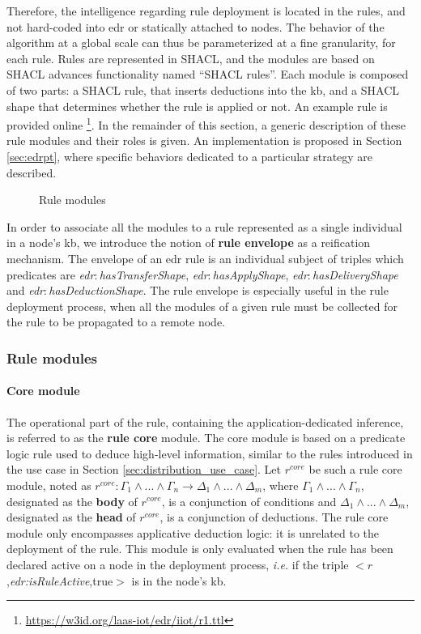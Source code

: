 \documentclass{iosart2c}
\newcommand{\namespace}[1]{\textit{#1$:$}}
\newcommand{\concept}[2]{\namespace{#1}\-\textit{#2}}
\newcommand{\triplet}[3]{$<$#1,\textit{#2},#3$>$}
\begin{document}
Therefore, the intelligence regarding rule deployment is located in the rules, and not hard-coded into \gls{edr} or statically attached to nodes. 
The behavior of the algorithm at a global scale can thus be parameterized at a fine granularity, for each rule.
Rules are represented in SHACL, and the modules are based on SHACL advances functionality named ``SHACL rules''.
Each module is composed of two parts: a SHACL rule, that inserts deductions into the \gls{kb}, and a SHACL shape that determines whether the rule is applied or not. 
An example rule is provided online \footnote{\url{https://w3id.org/laas-iot/edr/iiot/r1.ttl}}.
In the remainder of this section, a generic description of these rule modules and their roles is given. 
An implementation is proposed in Section \textsection \ref{sec:edrpt}, where specific behaviors dedicated to a particular strategy are described.

\begin{figure}
	\centering
	\caption{Rule modules}
	\label{fig:rule_modules}
	\scalebox{0.68}{
		
	}
\end{figure}

In order to associate all the modules to a rule represented as a single individual in a node's \gls{kb}, we introduce the notion of \textbf{rule envelope} as a reification mechanism. 
The envelope of an \gls{edr} rule is an individual subject of triples which predicates are \concept{edr}{has\-Transfer\-Shape}, \concept{edr}{has\-Apply\-Shape}, \concept{edr}{has\-Delivery\-Shape} and \concept{edr}{has\-Deduction\-Shape}.
The rule envelope is especially useful in the rule deployment process, when all the modules of a given rule must be collected for the rule to be propagated to a remote node.

\subsubsection{Rule modules}
\label{subsubs:modules}

\paragraph{Core module}
The operational part of the rule, containing the application-dedicated inference, is referred to as the \textbf{rule core} module. 
The core module is based on a predicate logic rule used to deduce high-level information, similar to the rules introduced in the use case in Section \textsection \ref{sec:distribution_use_case}. 
Let $r^{core}$ be such a rule core module, noted as $r^{core}: \Gamma_1 \land ... \land \Gamma_n \rightarrow \Delta_1 \land ... \land \Delta_m$, where $\Gamma_1 \land ... \land \Gamma_n$, designated as the \textbf{body} of $r^{core}$, is a conjunction of conditions and $\Delta_1 \land ... \land \Delta_m$, designated as the \textbf{head} of $r^{core}$, is a conjunction of deductions.
The rule core module only encompasses applicative deduction logic: it is unrelated to the deployment of the rule.
This module is only evaluated when the rule has been declared active on a node in the deployment process, \textit{i.e.} if the triple \triplet{$r$}{edr:is\-Rule\-Active}{true} is in the node's \gls{kb}.
\end{document}
